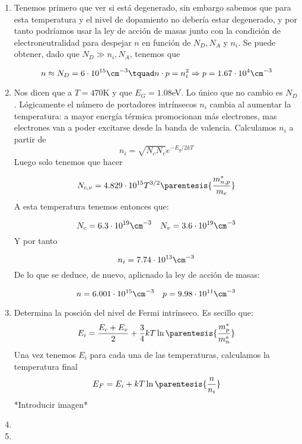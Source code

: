 	\begin{enumerate}[label=\alph*)]	
		\item Tenemos primero que ver si está degenerado, sin embargo sabemos que para esta temperatura y el nivel de dopamiento no debería estar degenerado, y por tanto podríamos usar la ley de acción de masas junto con la condición de electroneutralidad para despejar $n$ en función de $N_D,N_A$ y $n_i$. Se puede obtener, dado que $N_D \gg n_i,N_A$, tenemos que

		\begin{equation}
			n\approx N_D = 6\cdot 10^{15} \cm^{-3} \tquad n\cdot p = n_i^2 \Rightarrow p = 1.67 \cdot 10^4 \cm^{-3}
		\end{equation}
		\item Nos dicen que a $T=470$K y que $E_G=1.08$eV. Lo único que no cambio es $N_D$. Lógicamente el número de portadores intrínsecos $n_i$ cambia al aumentar la temperatura: a mayor energía térmica promocionan más electrones, mas electrones van a poder excitarse desde la banda de valencia. Calculamos $n_i$ a partir de
		\begin{equation}
			n_i = \sqrt{N_cN_v} e^{-E_g/2kT}
		\end{equation}
		Luego solo tenemos que hacer

		\begin{equation}
			N_{c,v} = 4.829\cdot 10^{15} T^{3/2} \parentesis{\frac{m_{n,p}^*}{m_e}}
		\end{equation}
		A esta temperatura tenemos entonces que:

		\begin{equation}
			N_c = 6.3 \cdot 10^{19} \cm^{-3} \quad N_v = 3.6 \cdot 10^{19} \cm^{-3}
		\end{equation}
		Y por tanto

		\begin{equation}
			n_i = 7.74 \cdot 10^{13} \cm^{-3}
		\end{equation}
		De lo que se deduce, de nuevo, aplicnado la ley de acción de masas:

		\begin{equation}
			n=6.001 \cdot 10^{15} \cm^{-3} \quad p = 9.98 \cdot 10^{11} \cm^{-3}
		\end{equation}
		\item Determina la posción del nivel de Fermi intrínseco. Es secillo que:
		\begin{equation}
			E_i = \frac{E_c + E_v}{2} + \frac{3}{4} kT \ln \parentesis{\frac{m_p^*}{m_n^*}}
		\end{equation}
		Una vez tenemos $E_i$ para cada una de las temperaturas, calculamos la temperatura final
		\begin{equation}
			E_F = E_i + kT \ln \parentesis{\frac{n}{n_i}}
		\end{equation}
		*Introducir imagen*
		\item
		\item
\end{enumerate}


	
